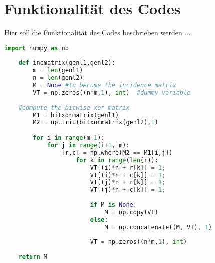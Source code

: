 \section{Funktionalität des Codes} \label{chpt:Implementierung_Funktionalitaet}
Hier soll die Funktionalität des Codes beschrieben werden ...




\lstset{style=mystyle}

\begin{lstlisting}[language=Python, caption=Python example]
	import numpy as np
	
	def incmatrix(genl1,genl2):
		m = len(genl1)
		n = len(genl2)
		M = None #to become the incidence matrix
		VT = np.zeros((n*m,1), int)  #dummy variable
	
	#compute the bitwise xor matrix
		M1 = bitxormatrix(genl1)
		M2 = np.triu(bitxormatrix(genl2),1) 
	
		for i in range(m-1):
			for j in range(i+1, m):
				[r,c] = np.where(M2 == M1[i,j])
					for k in range(len(r)):
						VT[(i)*n + r[k]] = 1;
						VT[(i)*n + c[k]] = 1;
						VT[(j)*n + r[k]] = 1;
						VT[(j)*n + c[k]] = 1;
	
						if M is None:
							M = np.copy(VT)
						else:
							M = np.concatenate((M, VT), 1)
	
						VT = np.zeros((n*m,1), int)
	
	return M
\end{lstlisting}